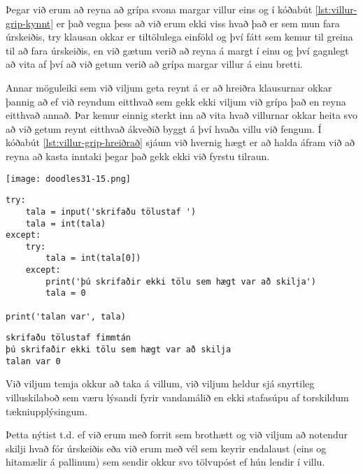 Þegar við erum að reyna að grípa svona margar villur eins og í kóðabút \ref{lst:villur-grip-kynnt} er það vegna þess að við erum ekki viss hvað það er sem mun fara úrskeiðis, try klausan okkar er tiltölulega einföld og því fátt sem kemur til greina til að fara úrskeiðis, en við gætum verið að reyna á margt í einu og því gagnlegt að vita af því að við getum verið að grípa margar villur á einu bretti.


Annar möguleiki sem við viljum geta reynt á er að hreiðra klausurnar okkar þannig að ef við reyndum eitthvað sem gekk ekki viljum við grípa það en reyna eitthvað annað.
Þar kemur einnig sterkt inn að vita hvað villurnar okkar heita svo að við getum reynt eitthvað ákveðið byggt á því hvaða villu við fengum.
Í kóðabút \ref{lst:villur-grip-hreiðrað} sjáum við hvernig hægt er að halda áfram við að reyna að kasta inntaki þegar það gekk ekki við fyrstu tilraun.


\phantom{easter egg}
\begin{center}
	\texttt{[image: doodles31-15.png]}
\end{center}

\begin{lstlisting}[caption=Hvernig á má hreiðra try - except - else, label=lst:villur-grip-hreiðrað]
try:
	tala = input('skrifaðu tölustaf ')
	tala = int(tala)
except:
	try:
		tala = int(tala[0])
	except:
		print('þú skrifaðir ekki tölu sem hægt var að skilja')
		tala = 0

print('talan var', tala)
\end{lstlisting}
\lstset{style=uttak}
\begin{lstlisting}
skrifaðu tölustaf fimmtán
þú skrifaðir ekki tölu sem hægt var að skilja
talan var 0
\end{lstlisting}
\lstset{style=venjulegt}
\phantom{easter egg}

Við viljum temja okkur að taka á villum, við viljum heldur sjá snyrtileg villuskilaboð sem væru lýsandi fyrir vandamálið en ekki stafasúpu af torskildum tækniupplýsingum.

Þetta nýtist t.d. ef við erum með forrit sem brothætt og við viljum að notendur skilji hvað fór úrskeiðis eða við erum með vél sem keyrir endalaust (eins og hitamælir á pallinum) sem sendir okkur svo tölvupóst ef hún lendir í villu.




